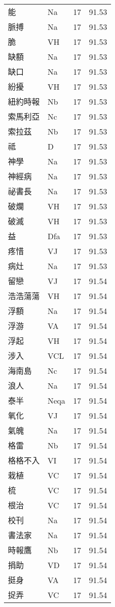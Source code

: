 \documentclass[twocolumn]{book}
\begin{document}
\begin{supertabular}{llrr}
能 & Na & 17 &  91.53\\
脈搏 & Na & 17 &  91.53\\
脆 & VH & 17 &  91.53\\
缺額 & Na & 17 &  91.53\\
缺口 & Na & 17 &  91.53\\
紛擾 & VH & 17 &  91.53\\
紐約時報 & Nb & 17 &  91.53\\
索馬利亞 & Nc & 17 &  91.53\\
索拉茲 & Nb & 17 &  91.53\\
祗 & D & 17 &  91.53\\
神學 & Na & 17 &  91.53\\
神經病 & Na & 17 &  91.53\\
祕書長 & Na & 17 &  91.53\\
破爛 & VH & 17 &  91.53\\
破滅 & VH & 17 &  91.53\\
益 & Dfa & 17 &  91.53\\
疼惜 & VJ & 17 &  91.53\\
病灶 & Na & 17 &  91.53\\
留戀 & VJ & 17 &  91.54\\
浩浩蕩蕩 & VH & 17 &  91.54\\
浮額 & Na & 17 &  91.54\\
浮游 & VA & 17 &  91.54\\
浮起 & VH & 17 &  91.54\\
涉入 & VCL & 17 &  91.54\\
海南島 & Nc & 17 &  91.54\\
浪人 & Na & 17 &  91.54\\
泰半 & Neqa & 17 &  91.54\\
氧化 & VJ & 17 &  91.54\\
氣魄 & Na & 17 &  91.54\\
格雷 & Nb & 17 &  91.54\\
格格不入 & VI & 17 &  91.54\\
栽植 & VC & 17 &  91.54\\
梳 & VC & 17 &  91.54\\
根治 & VC & 17 &  91.54\\
校刊 & Na & 17 &  91.54\\
書法家 & Na & 17 &  91.54\\
時報鷹 & Nb & 17 &  91.54\\
捐助 & VD & 17 &  91.54\\
挺身 & VA & 17 &  91.54\\
捉弄 & VC & 17 &  91.54\\

\end{supertabular}
\end{document}
